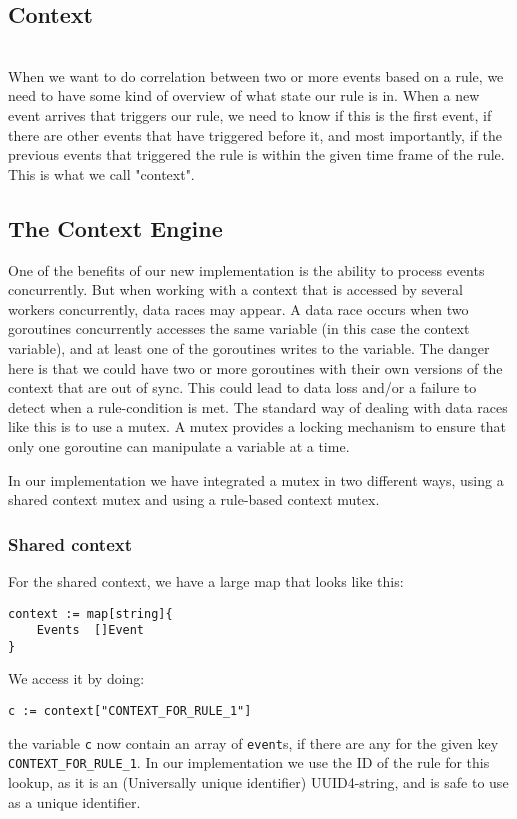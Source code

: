 \subsection{Context}
\\
When we want to do correlation between two or more events based on a rule, we need to have some kind of overview of what state our rule is in. When a new event arrives that triggers our rule, we need to know if this is the first event, if there are other events that have triggered before it, and most importantly, if the previous events that triggered the rule is within the given time frame of the rule. This is what we call "context".

\subsection{The Context Engine}
One of the benefits of our new implementation is the ability to process events concurrently. But when working with a context that is accessed by several workers concurrently, data races may appear. A data race occurs when two goroutines concurrently accesses the same variable (in this case the context variable), and at least one of the goroutines writes to the variable. The danger here is that we could have two or more goroutines with their own versions of the context that are out of sync. This could lead to data loss and/or a failure to detect when a rule-condition is met. The standard way of dealing with data races like this is to use a mutex. A mutex provides a locking mechanism to ensure that only one goroutine can manipulate a variable at a time.

In our implementation we have integrated a mutex in two different ways, using a shared context mutex and using a rule-based context mutex. 

\subsubsection{Shared context}

For the shared context, we have a large map that looks like this:
\begin{lstlisting}
context := map[string]{
    Events  []Event
}
\end{lstlisting}
We access it by doing:
\begin{lstlisting}
c := context["CONTEXT_FOR_RULE_1"]
\end{lstlisting}
the variable \lstinline{c} now contain an array of \lstinline{event}s, if there are any for the given key \lstinline{CONTEXT_FOR_RULE_1}. In our implementation we use the ID of the rule for this lookup, as it is an (Universally unique identifier) UUID4-string, and is safe to use as a unique identifier.


